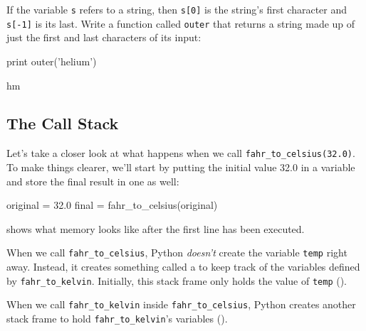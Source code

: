 \begin{challenge}
  If the variable \texttt{s} refers to a string, then \texttt{s{[}0{]}}
  is the string's first character and \texttt{s{[}-1{]}} is its last.
  Write a function called \texttt{outer} that returns a string made up
  of just the first and last characters of its input:

\begin{VerbIn}
print outer('helium')
\end{VerbIn}

\begin{VerbOut}
hm
\end{VerbOut}
\end{challenge}

\subsection{The Call Stack}

Let's take a closer look at what happens when we call
\texttt{fahr\_to\_celsius(32.0)}. To make things clearer, we'll start by
putting the initial value 32.0 in a variable and store the final result
in one as well:

\begin{VerbIn}
original = 32.0
final = fahr_to_celsius(original)
\end{VerbIn}


 shows what memory looks like after the first line has
been executed.

When we call \texttt{fahr\_to\_celsius}, Python \emph{doesn't} create
the variable \texttt{temp} right away. Instead, it creates something
called a  to keep track of the
variables defined by \texttt{fahr\_to\_kelvin}. Initially, this stack
frame only holds the value of \texttt{temp} ().


When we call \texttt{fahr\_to\_kelvin} inside
\texttt{fahr\_to\_celsius}, Python creates another stack frame to hold
\texttt{fahr\_to\_kelvin}'s variables ().


